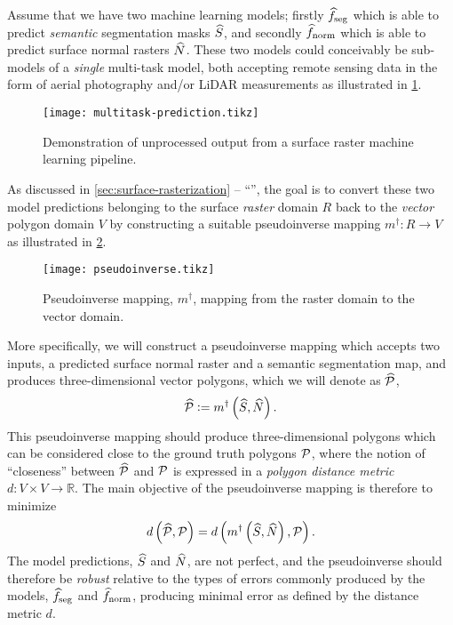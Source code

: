 Assume that we have two machine learning models; firstly $\widehat{f}_{\mathrm{seg}}$ which is able to predict \emph{semantic} segmentation masks $\widehat{S}$, and secondly $\widehat{f}_{\mathrm{norm}}$ which is able to predict surface normal rasters $\widehat{N}$.
These two models could conceivably be sub-models of a \emph{single} multi-task model, both accepting remote sensing data in the form of aerial photography and/or LiDAR measurements as illustrated in \cref{fig:multitask-prediction}.
\begin{figure}[H]
  \centering
  \texttt{[image: multitask-prediction.tikz]}
  \caption{%
    Demonstration of unprocessed output from a surface raster machine learning pipeline.
  }%
  \label{fig:multitask-prediction}
\end{figure}
\noindent
As discussed in \cref{sec:surface-rasterization} -- \enquote{}, the goal is to convert these two model predictions belonging to the surface \emph{raster} domain $R$ back to the \emph{vector} polygon domain $V$ by constructing a suitable pseudoinverse mapping $m^{\dagger}: R \rightarrow V$ as illustrated in \cref{fig:pseudoinverse}.
\begin{figure}[H]
  \centering
  \texttt{[image: pseudoinverse.tikz]}
  \caption{Pseudoinverse mapping, $m^{\dagger}$, mapping from the raster domain to the vector domain.}%
  \label{fig:pseudoinverse}
\end{figure}
\noindent
More specifically, we will construct a pseudoinverse mapping which accepts two inputs, a predicted surface normal raster and a semantic segmentation map, and produces three-dimensional vector polygons, which we will denote as $\widehat{\mathcal{P}}$,
\begin{equation*}
  \widehat{\mathcal{P}}
  \vcentcolon=
  m^{\dagger}\left(
    \widehat{S},
    \widehat{N}
  \right).
\end{equation*}
This pseudoinverse mapping should produce three-dimensional polygons which can be considered close to the ground truth polygons $\mathcal{P}$, where the notion of \enquote{closeness} between $\widehat{\mathcal{P}}$ and $\mathcal{P}$ is expressed in a \textit{polygon distance metric} $d: V \times V \rightarrow \mathbb{R}$.
The main objective of the pseudoinverse mapping is therefore to minimize
\begin{equation*}
  d\left(
    \widehat{\mathcal{P}},
    \mathcal{P}
  \right)
  =
  d\left(
    m^{\dagger}\left(\widehat{S}, \widehat{N}\right),
    \mathcal{P}
  \right).
\end{equation*}
The model predictions, $\widehat{S}$ and $\widehat{N}$, are not perfect, and the pseudoinverse should therefore be \textit{robust} relative to the types of errors commonly produced by the models, $\widehat{f}_{\mathrm{seg}}$ and $\widehat{f}_{\mathrm{norm}}$, producing minimal error as defined by the distance metric $d$.
